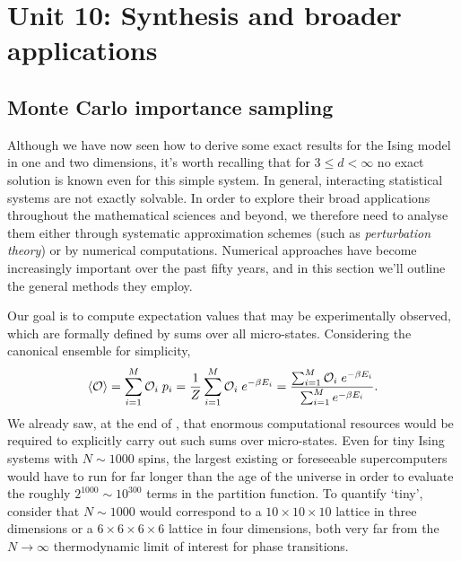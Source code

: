 \renewcommand{\thisunit}{MATH327 Unit 10}
\renewcommand{\moddate}{Last modified 6 May~2025}
\setcounter{section}{10}
\setcounter{subsection}{0}
{}
\section*{Unit 10: Synthesis and broader applications} %
\subsection{\label{sec:MonteCarlo}Monte Carlo importance sampling}
Although we have now seen how to derive some exact results for the Ising model in one and two dimensions, it's worth recalling that for $3 \leq d < \infty$ no exact solution is known even for this simple system.
In general, interacting statistical systems are not exactly solvable.
In order to explore their broad applications throughout the mathematical sciences and beyond, we therefore need to analyse them either through systematic approximation schemes (such as \emph{perturbation theory}) or by numerical computations.
Numerical approaches have become increasingly important over the past fifty years, and in this section we'll outline the general methods they employ.

Our goal is to compute expectation values that may be experimentally observed, which are formally defined by sums over all micro-states.
Considering the canonical ensemble for simplicity,
\begin{equation*}
  \left\langle \mathcal O \right\rangle = \sum_{i = 1}^M \mathcal O_i \; p_i = \frac{1}{Z} \sum_{i = 1}^M \mathcal O_i \; e^{-\beta E_i} = \frac{\sum_{i = 1}^M \mathcal O_i \; e^{-\beta E_i}}{\sum_{i = 1}^M e^{-\beta E_i}}.
\end{equation*}
We already saw, at the end of , that enormous computational resources would be required to explicitly carry out such sums over micro-states.
Even for tiny Ising systems with $N \sim 1000$ spins, the largest existing or foreseeable supercomputers would have to run for far longer than the age of the universe in order to evaluate the roughly $2^{1000} \sim 10^{300}$ terms in the partition function.
To quantify `tiny', consider that $N \sim 1000$ would correspond to a $10\times 10\times 10$ lattice in three dimensions or a $6\times 6\times 6\times 6$ lattice in four dimensions, both very far from the $N \to \infty$ thermodynamic limit of interest for phase transitions.

